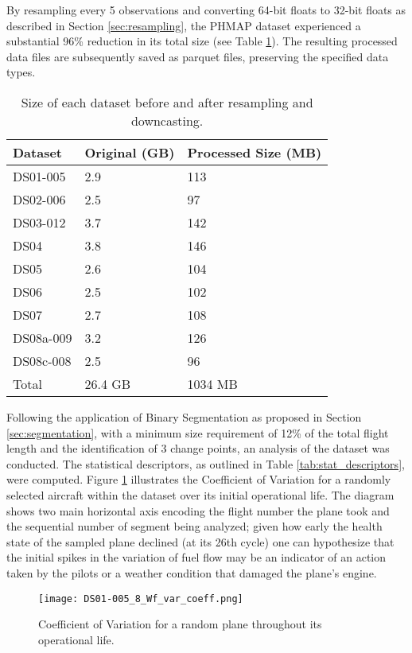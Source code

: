 \documentclass{IEEEtran}
\begin{document}
            By resampling every 5 observations and converting 64-bit floats to 32-bit floats as described in Section \ref{sec:resampling}, the PHMAP dataset experienced a substantial 96\% reduction in its total size (see Table \ref{tab:processed_sizes}). The resulting processed data files are subsequently saved as parquet files, preserving the specified data types.
            \begin{table}[!htbp]
                \caption{Size of each dataset before and after resampling and downcasting.}
                \label{tab:processed_sizes}
                \centering
                \begin{tabular}{lll}
                    \toprule
                    Dataset & Original (GB) & Processed Size (MB) \\
                    \midrule
                    DS01-005 & 2.9 & 113 \\
                    DS02-006 & 2.5 & 97 \\
                    DS03-012 & 3.7 & 142 \\
                    DS04 & 3.8 & 146 \\
                    DS05 & 2.6 & 104 \\
                    DS06 & 2.5 & 102 \\
                    DS07 & 2.7 & 108 \\
                    DS08a-009 & 3.2 & 126 \\
                    DS08c-008 & 2.5 & 96 \\
                    \midrule
                    Total & 26.4 GB & 1034 MB \\
                    \bottomrule
                \end{tabular}
            \end{table}

            Following the application of Binary Segmentation as proposed in Section \ref{sec:segmentation}, with a minimum size requirement of 12\% of the total flight length and the identification of 3 change points, an analysis of the dataset was conducted. The statistical descriptors, as outlined in Table \ref{tab:stat_descriptors}, were computed. Figure \ref{fig:var_coeff_sample} illustrates the Coefficient of Variation for a randomly selected aircraft within the dataset over its initial operational life. The diagram shows two main horizontal axis encoding the flight number the plane took and the sequential number of segment being analyzed; given how early the health state of the sampled plane declined (at its 26th cycle) one can hypothesize that the initial spikes in the variation of fuel flow may be an indicator of an action taken by the pilots or a weather condition that damaged the plane's engine.
            \begin{figure}[!htbp]
                \centering
                \texttt{[image: DS01-005\_8\_Wf\_var\_coeff.png]}
                \caption{Coefficient of Variation for a random plane throughout its operational life.}
                \label{fig:var_coeff_sample}
            \end{figure}
\end{document}
